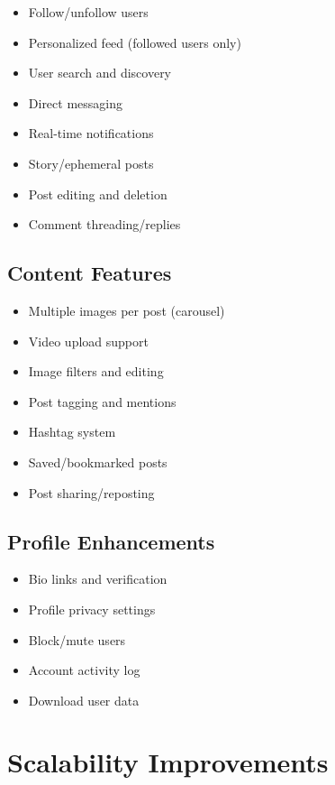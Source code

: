 \documentclass[12pt,a4paper]{report}
\begin{document}
\begin{itemize}
    \item Follow/unfollow users
    \item Personalized feed (followed users only)
    \item User search and discovery
    \item Direct messaging
    \item Real-time notifications
    \item Story/ephemeral posts
    \item Post editing and deletion
    \item Comment threading/replies
\end{itemize}

\subsection{Content Features}

\begin{itemize}
    \item Multiple images per post (carousel)
    \item Video upload support
    \item Image filters and editing
    \item Post tagging and mentions
    \item Hashtag system
    \item Saved/bookmarked posts
    \item Post sharing/reposting
\end{itemize}

\subsection{Profile Enhancements}

\begin{itemize}
    \item Bio links and verification
    \item Profile privacy settings
    \item Block/mute users
    \item Account activity log
    \item Download user data
\end{itemize}

\section{Scalability Improvements}
\end{document}
